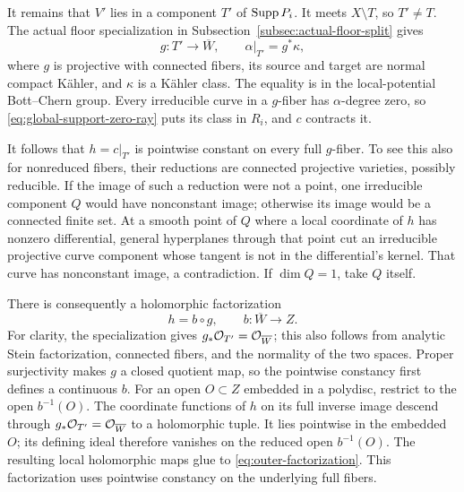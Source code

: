 It remains that \(V'\) lies in a component \(T'\) of \(\operatorname{Supp} P_i\).
It meets \(X\setminus T\), so \(T'\neq T\).  The actual floor
specialization in Subsection~\ref{subsec:actual-floor-split} gives
\begin{equation}\label{eq:outer-other-floor}
 g:T'\to\overline W,\qquad \alpha|_{T'}=g^*\kappa,
\end{equation}
where \(g\) is projective with connected fibers, its source and target
are normal compact K\"ahler, and \(\kappa\) is a K\"ahler class.
The equality is in the local-potential Bott--Chern group.
Every irreducible curve in a \(g\)-fiber has \(\alpha\)-degree zero,
so \eqref{eq:global-support-zero-ray} puts its class in \(R_i\), and
\(c\) contracts it.

It follows that \(h=c|_{T'}\) is pointwise constant on every full
\(g\)-fiber.  To see this also for nonreduced fibers, their reductions
are connected projective varieties, possibly reducible.  If the image
of such a reduction were
not a point, one irreducible component \(Q\) would have nonconstant
image; otherwise its image would be a connected finite set.  At a smooth
point of \(Q\) where a local coordinate of \(h\) has nonzero
differential, general hyperplanes through that point cut an irreducible
projective curve component whose tangent is not in the differential's
kernel.
That curve has nonconstant image, a contradiction.  If \(\dim Q=1\),
take \(Q\) itself.

There is consequently a holomorphic factorization
\begin{equation}\label{eq:outer-factorization}
 h=b\circ g,\qquad b:\overline W\to Z.
\end{equation}
For clarity, the specialization gives
\(g_*\mathcal O_{T'}=\mathcal O_{\overline W}\); this also follows from analytic
Stein factorization, connected fibers, and the normality of the two
spaces.  Proper surjectivity makes \(g\) a closed quotient map, so the
pointwise constancy first defines a continuous \(b\).  For an open
\(O\subset Z\) embedded in a polydisc, restrict to the open
\(b^{-1}(O)\).  The coordinate functions of \(h\) on its full inverse
image descend through \(g_*\mathcal O_{T'}=\mathcal O_{\overline W}\) to a
holomorphic tuple.  It lies pointwise in the embedded \(O\);
its defining ideal therefore vanishes on the reduced open \(b^{-1}(O)\).
The resulting local holomorphic maps glue to
\eqref{eq:outer-factorization}.  This factorization uses pointwise
constancy on the underlying full fibers.

